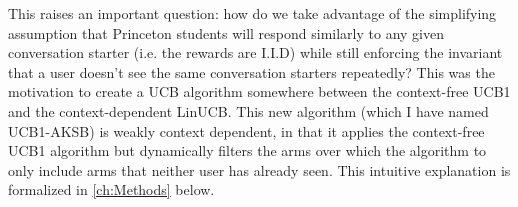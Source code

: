 This raises an important question: how do we take advantage of the simplifying assumption that Princeton students will respond similarly to any given conversation starter (i.e. the rewards are I.I.D) while still enforcing the invariant that a user doesn't see the same conversation starters repeatedly? This was the motivation to create a UCB algorithm somewhere between the context-free UCB1 and the context-dependent LinUCB. This new algorithm (which I have named UCB1-AKSB) is weakly context dependent, in that it applies the context-free UCB1 algorithm but dynamically filters the arms over which the algorithm to only include arms that neither user has already seen. This intuitive explanation is formalized in \autoref{ch:Methods} below.
